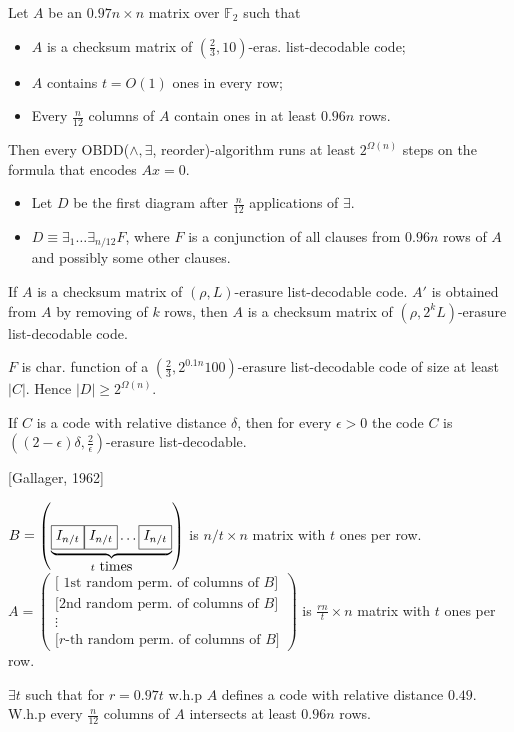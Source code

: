 {
\myth Let $A$ be an $0.97 n\times n$ matrix over $\mathbb{F}_2$ such that
\begin{itemize} 
\item  $A$ is a checksum matrix of $(\frac{2}{3}, 10)$-eras. list-decodable code;
\item $A$ contains $t=O(1)$ ones in every row;
\item Every $\frac{n}{12}$ columns of $A$ contain ones in at least $0.96 n$ rows. 
\end{itemize}
Then every
OBDD($\land,\exists$, reorder)-algorithm runs at least $2^{\Omega(n)}$ steps on the formula that encodes $Ax=0$.

\pause \dok
\begin{itemize}
\item Let $D$ be the first diagram  after $\frac{n}{12}$ applications of $\exists$.
\item $D\equiv \exists_1\dots \exists_{n/12} F$, where $F$ is a conjunction of
all clauses from $0.96n$ rows of $A$ and possibly some other clauses.
\end{itemize} \pause
\mylem If $A$ is a checksum matrix of $(\rho, L)$-erasure list-decodable code.
$A'$ is obtained from $A$ by removing of $k$ rows, then $A$ is a checksum matrix of
$(\rho, 2^kL)$-erasure list-decodable code.
\begin{itemize}
\pitem $F$ is char. function of a $(\frac{2}{3}, 2^{0.1 n} 100)$-erasure list-decodable code of size at least
$|C|$. Hence $|D|\ge 2^{\Omega(n)}$.
\end{itemize}
}

{
\mylem [Guruswami, 2003] If $C$ is a code with relative distance $\delta$, then for every $\epsilon > 0$ the code $C$ is $((2 - \epsilon) \delta,
    \frac{2}{\epsilon})$-erasure list-decodable.

\pause{}
[Gallager, 1962]

$B=\left( \underbrace{\fbox{$I_{n/t}$} \fbox{$I_{n/t}$}\dots \fbox{$I_{n/t}$}}_{t\mbox{ times}}\right)$
is $n/t \times n$ matrix with $t$ ones per row.
$A=
    \left(
        \begin{array}{c}
            {[}\mbox{ 1st random perm. of columns of }B {]}\\
            {[}\mbox{2nd random  perm. of columns of }B {]}\\
            \vdots \\
            {[}\mbox{$r$-th random perm. of columns of }B {]}
        \end{array}
    \right)
$ is $\frac{rn}{t}\times n$ matrix with $t$ ones per row.

\mylem $\exists t$ such that for $r=0.97 t$ w.h.p $A$ defines a code with relative distance
$0.49$. W.h.p every $\frac{n}{12}$ columns of $A$ intersects at least $0.96n$ rows.

}

